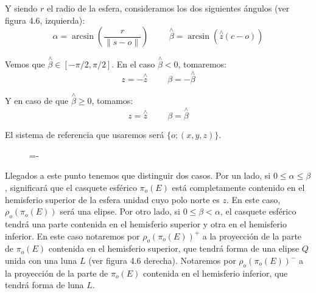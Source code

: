 Y siendo $r$ el radio de la esfera, consideramos los dos siguientes ángulos (ver figura 4.6, izquierda):
$$\alpha = \arcsin(\frac{r}{\|s-o\|}) \hspace{1cm} \overset{\wedge}{\beta}=\arcsin(\overset{\wedge}{z}(c-o))$$

Vemos que $\overset{\wedge}{\beta}\in[-\pi/2,\pi/2]$. En el caso $\overset{\wedge}{\beta}<0$, tomaremos:
$$z = -\overset{\wedge}{z}\hspace{1cm} \beta = -\overset{\wedge}{\beta}$$

Y en caso de que $\overset{\wedge}{\beta}\geq 0$, tomamos:
$$z = \overset{\wedge}{z}\hspace{1cm} \beta = \overset{\wedge}{\beta}$$

El sistema de referencia que usaremos será $\{o;(x,y,z)\}$.

\begin{figure}[h]
  \lineskip=-\fboxrule
\end{figure}

Llegados a este punto tenemos que distinguir dos casos. Por un lado, si $0\leq\alpha\leq\beta$, significará que el casquete esférico $\pi_o(E)$ está completamente contenido en el hemisferio superior de la esfera unidad cuyo polo norte es $z$. En este caso, $\rho_o(\pi_o(E))$ será una elipse. Por otro lado, si $0\leq\beta<\alpha$, el casquete esférico tendrá una parte contenida en el hemisferio superior y otra en el hemisferio inferior. En este caso notaremos por $\rho_o(\pi_o(E))^+$ a la proyección de la parte de $\pi_o(E)$ contenida en el hemisferio superior, que tendrá forma de una elipse $Q$ unida con una luna $L$ (ver figura 4.6 derecha). Notaremos por $\rho_o(\pi_o(E))^-$ a la proyección de la parte de $\pi_o(E)$ contenida en el hemisferio inferior, que tendrá forma de luna $L$.

